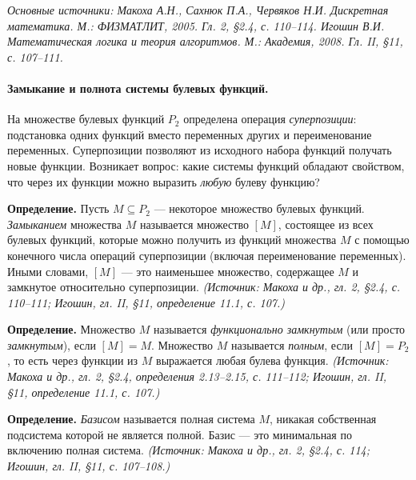\documentclass[a4paper,12pt]{article}
\begin{document}
\noindent\textit{Основные источники: Макоха А.Н., Сахнюк П.А., Червяков Н.И. Дискретная математика. М.: ФИЗМАТЛИТ, 2005. Гл. 2, §2.4, с. 110--114. Игошин В.И. Математическая логика и теория алгоритмов. М.: Академия, 2008. Гл. II, §11, с. 107--111.}

\paragraph{Замыкание и полнота системы булевых функций.}
На множестве булевых функций \(P_2\) определена операция \emph{суперпозиции}: подстановка одних функций вместо переменных других и переименование переменных. Суперпозиции позволяют из исходного набора функций получать новые функции. Возникает вопрос: какие системы функций обладают свойством, что через их функции можно выразить \emph{любую} булеву функцию?

\textbf{Определение.} Пусть \(M\subseteq P_2\) — некоторое множество булевых функций. \emph{Замыканием} множества \(M\) называется множество \([M]\), состоящее из всех булевых функций, которые можно получить из функций множества \(M\) с помощью конечного числа операций суперпозиции (включая переименование переменных). Иными словами, \([M]\) — это наименьшее множество, содержащее \(M\) и замкнутое относительно суперпозиции.
\textit{(Источник: Макоха и др., гл. 2, §2.4, с. 110--111; Игошин, гл. II, §11, определение 11.1, с. 107.)}

\textbf{Определение.} Множество \(M\) называется \emph{функционально замкнутым} (или просто \emph{замкнутым}), если \([M]=M\). Множество \(M\) называется \emph{полным}, если \([M]=P_2\), то есть через функции из \(M\) выражается любая булева функция.
\textit{(Источник: Макоха и др., гл. 2, §2.4, определения 2.13--2.15, с. 111--112; Игошин, гл. II, §11, определение 11.1, с. 107.)}

\textbf{Определение.} \emph{Базисом} называется полная система \(M\), никакая собственная подсистема которой не является полной. Базис — это минимальная по включению полная система.
\textit{(Источник: Макоха и др., гл. 2, §2.4, с. 114; Игошин, гл. II, §11, с. 107--108.)}
\end{document}
